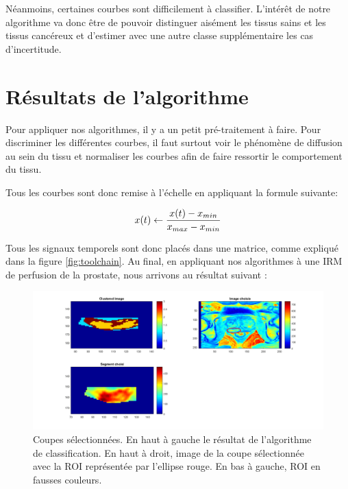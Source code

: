\medskip

Néanmoins, certaines courbes sont difficilement à classifier. L'intérêt de notre algorithme va donc être de pouvoir distinguer aisément les tissus sains et les tissus cancéreux et d'estimer avec une autre classe supplémentaire les cas d'incertitude.


\section{Résultats de l'algorithme}

Pour appliquer nos algorithmes, il y a un petit pré-traitement à faire. Pour discriminer les différentes courbes, il faut surtout voir le phénomène de diffusion au sein du tissu et normaliser les courbes afin de faire ressortir le comportement du tissu.
\medskip

Tous les courbes sont donc remise à l'échelle en appliquant la formule suivante:

\begin{equation}
\centering
x(t) \gets \frac{x(t)-x_{min}}{x_{max}-x_{min}}
\end{equation} 

\medskip

Tous les signaux temporels sont donc placés dans une matrice, comme expliqué dans la figure \ref{fig:toolchain}. 
Au final, en appliquant nos algorithmes à une IRM de perfusion de la prostate, nous arrivons au résultat suivant :

\begin{figure}[H]
\centering
    \includegraphics[scale=0.4,angle=0]{Images/3classProstate2.png}
    \caption{Coupes sélectionnées. En haut à gauche le résultat de l'algorithme de classification. En haut à droit, image de la coupe sélectionnée avec la ROI représentée par l'ellipse rouge. En bas à gauche, ROI en fausses couleurs.}
    \label{fig:3classProstate2}
\end{figure} 

